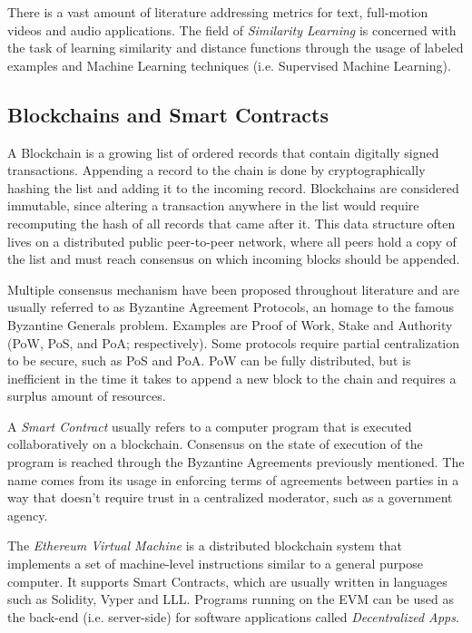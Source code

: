 \documentclass[conference]{IEEEtran}
\begin{document}
There is a vast amount of literature addressing metrics for text, full-motion videos and audio applications. The field of \emph{Similarity Learning} is concerned with the task of learning similarity and distance functions through the usage of labeled examples and Machine Learning techniques (i.e. Supervised Machine Learning).
 

\subsection{Blockchains and Smart Contracts}
A Blockchain is a growing list of ordered records that contain digitally signed transactions. Appending a record to the chain is done by cryptographically hashing the list and adding it to the incoming record. Blockchains are considered immutable, since altering a transaction anywhere in the list would require recomputing the hash of all records that came after it. This data structure often lives on a distributed public peer-to-peer network, where all peers hold a copy of the list and must reach consensus on which incoming blocks should be appended. 

Multiple consensus mechanism have been proposed throughout literature and are usually referred to as Byzantine Agreement Protocols, an homage to the famous Byzantine Generals problem. Examples are Proof of Work, Stake and Authority (PoW, PoS, and PoA; respectively). Some protocols require partial centralization to be secure, such as PoS and PoA. PoW can be fully distributed, but is inefficient in the time it takes to append a new block to the chain and requires a surplus amount of resources.

A \emph{Smart Contract} usually refers to a computer program that is executed collaboratively on a blockchain. Consensus on the state of execution of the program is reached through the Byzantine Agreements previously mentioned. The name comes from its usage in enforcing terms of agreements between parties in a way that doesn't require trust in a centralized moderator, such as a government agency.

The \emph{Ethereum Virtual Machine} is a distributed blockchain system that implements a set of machine-level instructions similar to a general purpose computer. It supports Smart Contracts, which are usually written in languages such as Solidity, Vyper and LLL. Programs running on the EVM can be used as the back-end (i.e. server-side) for software applications called \emph{Decentralized Apps}.
\end{document}
